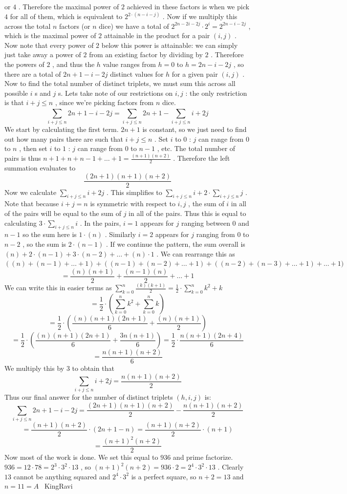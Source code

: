 \documentclass[12pt]{article}
\begin{document}
or $4$ . Therefore the maximal power of $2$ achieved in these factors is when we pick $4$ for all of them, which is equivalent to $2^{2\cdot (n-i-j)}$ . Now if we multiply this across the total $n$ factors (or $n$ dice) we have a total of $2^{2n-2i-2j} \cdot 2^i = 2^{2n-i-2j}$ , which is the maximal power of $2$ attainable in the product for a pair $(i,j)$ . Now note that every power of $2$ below this power is attainable: we can simply just take away a power of $2$ from an existing factor by dividing by $2$ . Therefore the powers of $2$ , and thus the $h$ value ranges from $h=0$ to $h=2n-i-2j$ , so there are a total of $2n+1-i-2j$ distinct values for $h$ for a given pair $(i,j)$ . Now to find the total number of distinct triplets, we must sum this across all possible $i$ s and $j$ s. Lets take note of our restrictions on $i,j$ : the only restriction is that $i+j \leq n$ , since we're picking factors from $n$ dice. \[\sum_{i+j\leq n}^{} 2n+1-i-2j = \sum_{i+j \leq n}^{} 2n+1 - \sum_{i+j \leq n}^{} i+2j\] We start by calculating the first term. $2n+1$ is constant, so we just need to find out how many pairs there are such that $i+j \leq n$ . Set $i$ to $0$ : $j$ can range from $0$ to $n$ , then set $i$ to $1$ : $j$ can range from $0$ to $n-1$ , etc. The total number of pairs is thus $n+1+n+n-1+\dots+1 = \frac{(n+1)(n+2)}{2}$ . Therefore the left summation evaluates to \[\frac{(2n+1)(n+1)(n+2)}{2}\] Now we calculate $\sum_{i+j \leq n}^{} i+2j$ . This simplifies to $\sum_{i+j \leq n}^{} i + 2 \cdot \sum_{i+j \leq n}^{} j$ . Note that because $i+j = n$ is symmetric with respect to $i,j$ , the sum of $i$ in all of the pairs will be equal to the sum of $j$ in all of the pairs. Thus this is equal to calculating $3 \cdot \sum_{i+j \leq n}^{} i$ . In the pairs, $i=1$ appears for $j$ ranging between $0$ and $n-1$ so the sum here is $1 \cdot (n)$ . Similarly $i=2$ appears for $j$ ranging from $0$ to $n-2$ , so the sum is $2 \cdot (n-1)$ . If we continue the pattern, the sum overall is $(n)+2 \cdot (n-1) + 3 \cdot (n-2) + \dots + (n) \cdot 1$ . We can rearrange this as $((n)+(n-1)+ \dots + 1) + ((n-1)+(n-2)+ \dots + 1)+ ((n-2)+(n-3)+ \dots + 1) + \dots + 1)$ \[= \frac{(n)(n+1)}{2} + \frac{(n-1)(n)}{2}+ \dots + 1\] We can write this in easier terms as $\sum_{k=0}^{n} \frac{(k)(k+1)}{2} = \frac{1}{2} \cdot \sum_{k=0}^{n} k^2+k$ \[=\frac{1}{2} \cdot( \sum_{k=0}^{n} k^2 + \sum_{k=0}^{n} k)\] \[= \frac{1}{2} \cdot ( \frac{(n)(n+1)(2n+1)}{6} + \frac{(n)(n+1)}{2})\] \[= \frac{1}{2} \cdot ( \frac{(n)(n+1)(2n+1)}{6} + \frac{3n(n+1)}{6}) = \frac{1}{2} \cdot \frac{n(n+1)(2n+4)}{6}\] \[= \frac{n(n+1)(n+2)}{6}\] We multiply this by $3$ to obtain that \[\sum_{i+j \leq n}^{} i+2j = \frac{n(n+1)(n+2)}{2}\] Thus our final answer for the number of distinct triplets $(h,i,j)$ is: \[\sum_{i+j\leq n}^{} 2n+1-i-2j = \frac{(2n+1)(n+1)(n+2)}{2} - \frac{n(n+1)(n+2)}{2}\] \[= \frac{(n+1)(n+2)}{2} \cdot (2n+1-n) = \frac{(n+1)(n+2)}{2} \cdot (n+1)\] \[= \frac{(n+1)^2(n+2)}{2}\] Now most of the work is done. We set this equal to $936$ and prime factorize. $936 = 12 \cdot 78 = 2^3 \cdot 3^2 \cdot 13$ , so $(n+1)^2(n+2) = 936 \cdot 2 = 2^4 \cdot 3^2 \cdot 13$ . Clearly $13$ cannot be anything squared and $2^4 \cdot 3^2$ is a perfect square, so $n+2 = 13$ and $n = 11 = \boxed{A}$ ~KingRavi
\end{document}
